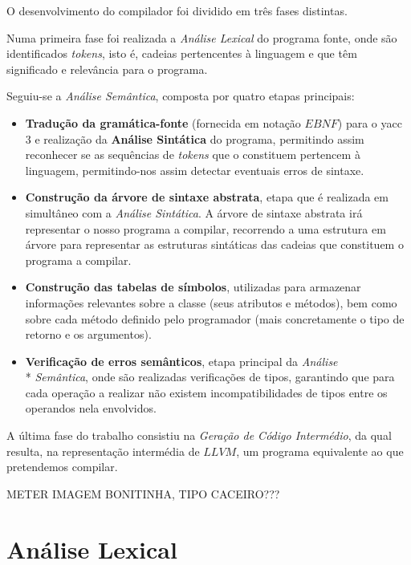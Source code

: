 \documentclass[11pt,a4paper]{article}
\begin{document}
O desenvolvimento do compilador foi dividido em três fases distintas.

Numa primeira fase foi realizada a \emph{Análise Lexical} do programa fonte, onde são identificados \emph{tokens}, isto é, cadeias pertencentes à linguagem e que têm significado e relevância para o programa.

Seguiu-se a \emph{Análise Semântica}, composta por quatro etapas principais:

\begin{itemize}
\item \textbf{Tradução da gramática-fonte} (fornecida em notação $EBNF$) para o yacc 3 e realização da \textbf{Análise Sintática} do programa, permitindo assim reconhecer se as sequências de \emph{tokens} que o constituem pertencem à linguagem, permitindo-nos assim detectar eventuais erros de sintaxe.

\item \textbf{Construção da árvore de sintaxe abstrata}, etapa que é realizada em simultâneo com a \emph{Análise Sintática}. A árvore de sintaxe abstrata irá representar o nosso programa a compilar, recorrendo a uma estrutura em árvore para representar as estruturas sintáticas das cadeias que constituem o programa a compilar.

\item \textbf{Construção das tabelas de símbolos}, utilizadas para armazenar informações relevantes sobre a classe (seus atributos e métodos), bem como sobre cada método definido pelo programador (mais concretamente o tipo de retorno e os argumentos).

\item \textbf{Verificação de erros semânticos}, etapa principal da \emph{Análise} \\* \emph{Semântica}, onde são realizadas verificações de tipos, garantindo que para cada operação a realizar não existem incompatibilidades de tipos entre os operandos nela envolvidos.

\end{itemize}

A última fase do trabalho consistiu na \emph{Geração de Código Intermédio}, da qual resulta, na representação intermédia de $LLVM$, um programa equivalente ao que pretendemos compilar.

METER IMAGEM BONITINHA, TIPO CACEIRO???

\pagebreak

\section{Análise Lexical}
\end{document}
